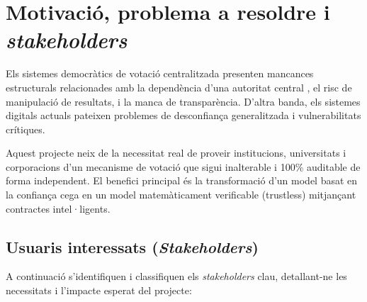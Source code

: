 \documentclass[12pt,a4paper]{article}
\begin{document}
\tableofcontents
\newpage

\section{Motivació, problema a resoldre i \textit{stakeholders}}

Els sistemes democràtics de votació centralitzada presenten mancances estructurals relacionades amb la dependència d'una autoritat central , el risc de manipulació de resultats, i la manca de transparència. D'altra banda, els sistemes digitals actuals pateixen problemes de desconfiança generalitzada i vulnerabilitats crítiques. 

Aquest projecte neix de la necessitat real de proveir institucions, universitats i corporacions d'un mecanisme de votació que sigui inalterable i 100\% auditable de forma independent. El benefici principal és la transformació d'un model basat en la confiança cega en un model matemàticament verificable (trustless) mitjançant contractes intel·ligents.

\subsection{Usuaris interessats (\textit{Stakeholders})}
A continuació s'identifiquen i classifiquen els \textit{stakeholders} clau, detallant-ne les necessitats i l'impacte esperat del projecte:
\end{document}
